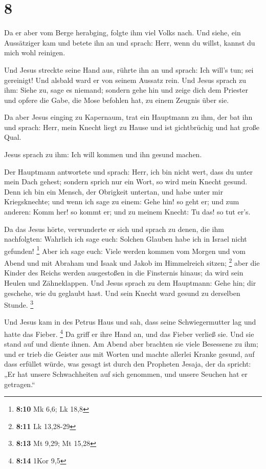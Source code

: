 \hypertarget{section-6}{%
\section{8}\label{section-6}}

 Da er aber vom Berge herabging, folgte ihm viel Volks nach.
 Und siehe, ein Aussätziger kam und betete ihn an und
sprach: Herr, wenn du willst, kannst du mich wohl reinigen.

 Und Jesus streckte seine Hand aus, rührte ihn an und
sprach: Ich will's tun; sei gereinigt! Und alsbald ward er von seinem
Aussatz rein.  Und Jesus sprach zu ihm: Siehe zu, sage es
niemand; sondern gehe hin und zeige dich dem Priester und opfere die
Gabe, die Mose befohlen hat, zu einem Zeugnis über sie.

 Da aber Jesus einging zu Kapernaum, trat ein Hauptmann zu
ihm, der bat ihn  und sprach: Herr, mein Knecht liegt zu
Hause und ist gichtbrüchig und hat große Qual.

 Jesus sprach zu ihm: Ich will kommen und ihn gesund machen.

 Der Hauptmann antwortete und sprach: Herr, ich bin nicht
wert, dass du unter mein Dach gehest; sondern sprich nur ein Wort, so
wird mein Knecht gesund.  Denn ich bin ein Mensch, der
Obrigkeit untertan, und habe unter mir Kriegsknechte; und wenn ich sage
zu einem: Gehe hin! so geht er; und zum anderen: Komm her! so kommt er;
und zu meinem Knecht: Tu das! so tut er's.

 Da das Jesus hörte, verwunderte er sich und sprach zu
denen, die ihm nachfolgten: Wahrlich ich sage euch: Solchen Glauben habe
ich in Israel nicht gefunden! \footnote{\textbf{8:10} Mk 6,6; Lk 18,8}
 Aber ich sage euch: Viele werden kommen vom Morgen und vom
Abend und mit Abraham und Isaak und Jakob im Himmelreich sitzen;
\footnote{\textbf{8:11} Lk 13,28-29}  aber die Kinder des
Reichs werden ausgestoßen in die Finsternis hinaus; da wird sein Heulen
und Zähneklappen.  Und Jesus sprach zu dem Hauptmann: Gehe
hin; dir geschehe, wie du geglaubt hast. Und sein Knecht ward gesund zu
derselben Stunde. \footnote{\textbf{8:13} Mt 9,29; Mt 15,28}

 Und Jesus kam in des Petrus Haus und sah, dass seine
Schwiegermutter lag und hatte das Fieber. \footnote{\textbf{8:14} 1Kor
  9,5}  Da griff er ihre Hand an, und das Fieber verließ
sie. Und sie stand auf und diente ihnen.  Am Abend aber
brachten sie viele Besessene zu ihm; und er trieb die Geister aus mit
Worten und machte allerlei Kranke gesund,  auf dass
erfüllet würde, was gesagt ist durch den Propheten Jesaja, der da
spricht: „Er hat unsere Schwachheiten auf sich genommen, und unsere
Seuchen hat er getragen.``

